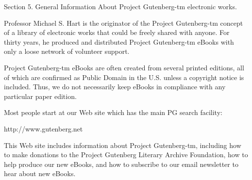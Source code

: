 Section 5.  General Information About Project Gutenberg-tm electronic
works.

Professor Michael S. Hart is the originator of the Project Gutenberg-tm
concept of a library of electronic works that could be freely shared
with anyone.  For thirty years, he produced and distributed Project
Gutenberg-tm eBooks with only a loose network of volunteer support.


Project Gutenberg-tm eBooks are often created from several printed
editions, all of which are confirmed as Public Domain in the U.S.
unless a copyright notice is included.  Thus, we do not necessarily
keep eBooks in compliance with any particular paper edition.


Most people start at our Web site which has the main PG search facility:

     http://www.gutenberg.net

This Web site includes information about Project Gutenberg-tm,
including how to make donations to the Project Gutenberg Literary
Archive Foundation, how to help produce our new eBooks, and how to
subscribe to our email newsletter to hear about new eBooks.
